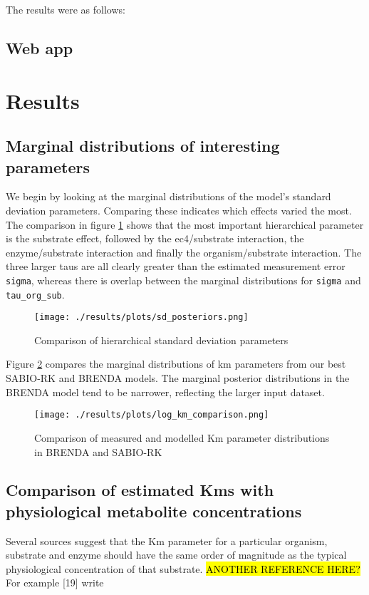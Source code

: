 \documentclass[11pt]{article}
\makeatletter
\newcommand{\citeprocitem}[2]{\hyper@linkstart{cite}{citeproc_bib_item_#1}#2\hyper@linkend}
\makeatother
\begin{document}
The results were as follows:

\subsection{Web app}
\label{sec:orgb84573d}
\section{Results}
\label{sec:org2a0d786}
\subsection{Marginal distributions of interesting parameters}
\label{sec:org3eae566}
We begin by looking at the marginal distributions of the model's standard
deviation parameters. Comparing these indicates which effects varied the
most. The comparison in figure \ref{fig:org6d5a538} shows that the most important
hierarchical parameter is the substrate effect, followed by the ec4/substrate
interaction, the enzyme/substrate interaction and finally the organism/substrate
interaction. The three larger taus are all clearly greater than the estimated
measurement error \texttt{sigma}, whereas there is overlap between the marginal
distributions for \texttt{sigma} and \texttt{tau\_org\_sub}.

\begin{figure}[htbp]
\centering
\texttt{[image: ./results/plots/sd\_posteriors.png]}
\caption{\label{fig:org6d5a538}Comparison of hierarchical standard deviation parameters}
\end{figure}

Figure \ref{fig:org39dd938} compares the marginal distributions of km
parameters from our best SABIO-RK and BRENDA models. The marginal posterior
distributions in the BRENDA model tend to be narrower, reflecting the larger
input dataset.

\begin{figure}[htbp]
\centering
\texttt{[image: ./results/plots/log\_km\_comparison.png]}
\caption{\label{fig:org39dd938}Comparison of measured and modelled Km parameter distributions in BRENDA and SABIO-RK}
\end{figure}

\subsection{Comparison of estimated Kms with physiological metabolite concentrations}
\label{sec:org4b904a8}
Several sources suggest that the Km parameter for a particular organism,
substrate and enzyme should have the same order of magnitude as the typical
physiological concentration of that substrate. \hl{ANOTHER REFERENCE HERE?} For example
\citeprocitem{19}{[19]} write
\end{document}
